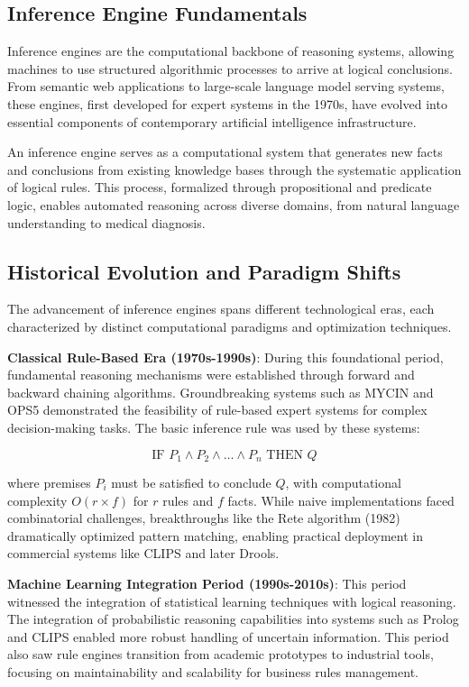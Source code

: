 \documentclass[12pt,a4paper]{article}
\begin{document}
\subsection{Inference Engine Fundamentals}
Inference engines are the computational backbone of reasoning systems, allowing machines to use structured algorithmic processes to arrive at logical conclusions. From semantic web applications to large-scale language model serving systems, these engines, first developed for expert systems in the 1970s, have evolved into essential components of contemporary artificial intelligence infrastructure.

An inference engine serves as a computational system that generates new facts and conclusions from existing knowledge bases through the systematic application of logical rules. This process, formalized through propositional and predicate logic, enables automated reasoning across diverse domains, from natural language understanding to medical diagnosis.

\subsection{Historical Evolution and Paradigm Shifts}
The advancement of inference engines spans different technological eras, each characterized by distinct computational paradigms and optimization techniques.

\textbf{Classical Rule-Based Era (1970s-1990s)}: During this foundational period, fundamental reasoning mechanisms were established through forward and backward chaining algorithms. Groundbreaking systems such as MYCIN and OPS5 demonstrated the feasibility of rule-based expert systems for complex decision-making tasks. The basic inference rule was used by these systems:

\begin{equation}
\text{IF } P_1 \wedge P_2 \wedge \ldots \wedge P_n \text{ THEN } Q
\end{equation}

where premises $P_i$ must be satisfied to conclude $Q$, with computational complexity $O(r \times f)$ for $r$ rules and $f$ facts. While naive implementations faced combinatorial challenges, breakthroughs like the Rete algorithm (1982) dramatically optimized pattern matching, enabling practical deployment in commercial systems like CLIPS and later Drools.

\textbf{Machine Learning Integration Period (1990s-2010s)}: This period witnessed the integration of statistical learning techniques with logical reasoning. The integration of probabilistic reasoning capabilities into systems such as Prolog and CLIPS enabled more robust handling of uncertain information. This period also saw rule engines transition from academic prototypes to industrial tools, focusing on maintainability and scalability for business rules management.
\end{document}
